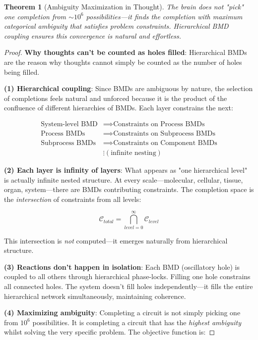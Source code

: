 \documentclass[11pt,a4paper]{article}
\newtheorem{theorem}{Theorem}
\begin{document}
\begin{theorem}[Ambiguity Maximization in Thought]
\label{thm:ambiguity_optimization}
The brain does not "pick" one completion from $\sim 10^6$ possibilities—it finds the completion with \textit{maximum categorical ambiguity} that satisfies problem constraints. Hierarchical BMD coupling ensures this convergence is natural and effortless.
\end{theorem}

\begin{proof}
\textbf{Why thoughts can't be counted as holes filled}: Hierarchical BMDs are the reason why thoughts cannot simply be counted as the number of holes being filled.

\textbf{(1) Hierarchical coupling}: Since BMDs are ambiguous by nature, the selection of completions feels natural and unforced because it is the product of the confluence of different hierarchies of BMDs. Each layer constrains the next:

\begin{align}
\text{System-level BMD} &\implies \text{Constraints on Process BMDs} \\
\text{Process BMDs} &\implies \text{Constraints on Subprocess BMDs} \\
\text{Subprocess BMDs} &\implies \text{Constraints on Component BMDs} \\
&\vdots (\text{infinite nesting})
\end{align}

\textbf{(2) Each layer is infinity of layers}: What appears as "one hierarchical level" is actually infinite nested structure. At every scale—molecular, cellular, tissue, organ, system—there are BMDs contributing constraints. The completion space is the \textit{intersection} of constraints from all levels:

\begin{equation}
\mathcal{C}_{total} = \bigcap_{level=0}^{\infty} \mathcal{C}_{level}
\end{equation}

This intersection is \textit{not} computed—it emerges naturally from hierarchical structure.

\textbf{(3) Reactions don't happen in isolation}: Each BMD (oscillatory hole) is coupled to all others through hierarchical phase-locks. Filling one hole constrains all connected holes. The system doesn't fill holes independently—it fills the entire hierarchical network simultaneously, maintaining coherence.

\textbf{(4) Maximizing ambiguity}: Completing a circuit is not simply picking one from $10^6$ possibilities. It is completing a circuit that has the \textit{highest ambiguity} whilst solving the very specific problem. The objective function is:


\end{proof}
\end{document}
